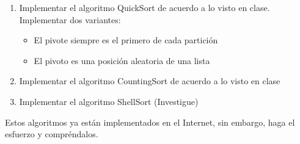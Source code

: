 \documentclass[twocolumn]{article}
\begin{document}
\begin{enumerate}
	\item Implementar el algoritmo QuickSort de acuerdo a lo visto en clase. Implementar dos variantes:
	\begin{itemize}
		\item El pivote siempre es el primero de cada partición
		\item El pivoto es una posición aleatoria de una lista
	\end{itemize}
	\item Implementar el algoritmo CountingSort de acuerdo a lo visto en clase
	\item Implementar el algoritmo ShellSort (Investigue)
\end{enumerate}

Estos algoritmos ya están implementados en el Internet, sin embargo, haga el esfuerzo y compréndalos.
\end{document}
